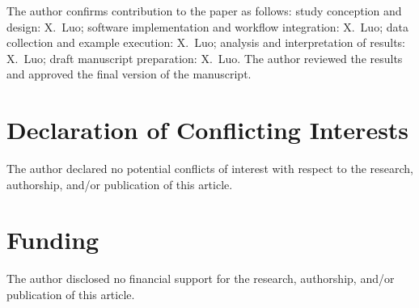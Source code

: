 \documentclass[10pt,numbered]{\selectedmanuscriptclass}
\begin{document}
The author confirms contribution to the paper as follows: study conception and
design: X.~Luo; software implementation and workflow integration: X.~Luo; data
collection and example execution: X.~Luo; analysis and interpretation of
results: X.~Luo; draft manuscript preparation: X.~Luo. The author reviewed the
results and approved the final version of the manuscript.

\section{Declaration of Conflicting Interests}

The author declared no potential conflicts of interest with respect to the
research, authorship, and/or publication of this article.

\section{Funding}

The author disclosed no financial support for the research, authorship, and/or
publication of this article.
\end{document}

